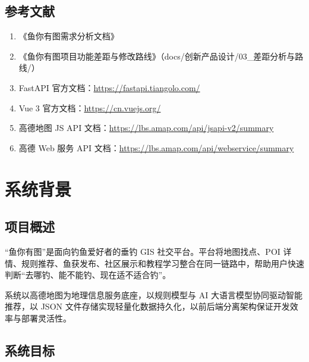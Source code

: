 \documentclass[12pt,a4paper]{ctexart}
\begin{document}
\subsection{参考文献}

\begin{enumerate}
  \item 《鱼你有图需求分析文档》
  \item 《鱼你有图项目功能差距与修改路线》（docs/创新产品设计/03\_差距分析与路线/）
  \item FastAPI 官方文档：\url{https://fastapi.tiangolo.com/}
  \item Vue 3 官方文档：\url{https://cn.vuejs.org/}
  \item 高德地图 JS API 文档：\url{https://lbs.amap.com/api/jsapi-v2/summary}
  \item 高德 Web 服务 API 文档：\url{https://lbs.amap.com/api/webservice/summary}
\end{enumerate}

\newpage

\section{系统背景}

\subsection{项目概述}

“鱼你有图”是面向钓鱼爱好者的垂钓 GIS 社交平台。平台将地图找点、POI 详情、规则推荐、鱼获发布、社区展示和教程学习整合在同一链路中，帮助用户快速判断“去哪钓、能不能钓、现在适不适合钓”。

系统以高德地图为地理信息服务底座，以规则模型与 AI 大语言模型协同驱动智能推荐，以 JSON 文件存储实现轻量化数据持久化，以前后端分离架构保证开发效率与部署灵活性。

\subsection{系统目标}
\end{document}
